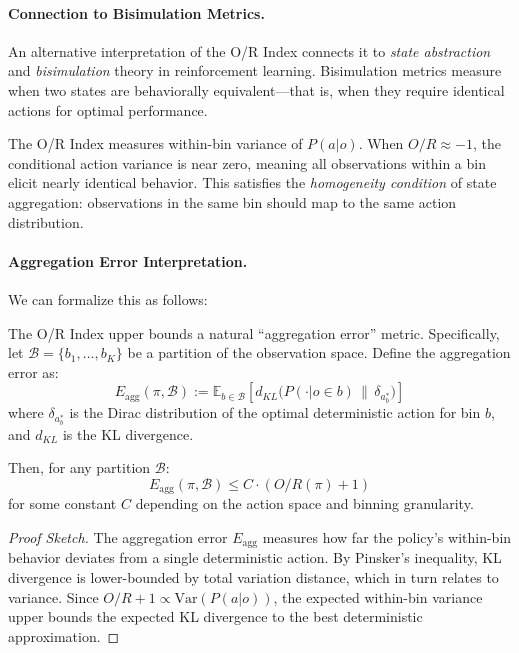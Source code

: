 \paragraph{Connection to Bisimulation Metrics.}
An alternative interpretation of the O/R Index connects it to \textit{state abstraction} and \textit{bisimulation} theory in reinforcement learning. Bisimulation metrics \citep{ferns2004bisimulation, castro2009equivalence} measure when two states are behaviorally equivalent—that is, when they require identical actions for optimal performance.

The O/R Index measures within-bin variance of $P(a|o)$. When $O/R \approx -1$, the conditional action variance is near zero, meaning all observations within a bin elicit nearly identical behavior. This satisfies the \textit{homogeneity condition} of state aggregation: observations in the same bin should map to the same action distribution.

\paragraph{Aggregation Error Interpretation.}
We can formalize this as follows:

\begin{proposition}
\label{prop:abstraction}
The O/R Index upper bounds a natural ``aggregation error'' metric. Specifically, let $\mathcal{B} = \{b_1, \dots, b_K\}$ be a partition of the observation space. Define the aggregation error as:
\begin{equation}
E_{\text{agg}}(\pi, \mathcal{B}) := \mathbb{E}_{b \in \mathcal{B}} \left[ d_{KL}\Big(P(\cdot | o \in b) \,\|\, \delta_{a^*_b}\Big) \right]
\end{equation}
where $\delta_{a^*_b}$ is the Dirac distribution of the optimal deterministic action for bin $b$, and $d_{KL}$ is the KL divergence.

Then, for any partition $\mathcal{B}$:
\begin{equation}
E_{\text{agg}}(\pi, \mathcal{B}) \leq C \cdot (O/R(\pi) + 1)
\end{equation}
for some constant $C$ depending on the action space and binning granularity.
\end{proposition}

\begin{proof}[Proof Sketch]
The aggregation error $E_{\text{agg}}$ measures how far the policy's within-bin behavior deviates from a single deterministic action. By Pinsker's inequality, KL divergence is lower-bounded by total variation distance, which in turn relates to variance. Since $O/R + 1 \propto \text{Var}(P(a|o))$, the expected within-bin variance upper bounds the expected KL divergence to the best deterministic approximation.
\end{proof}


